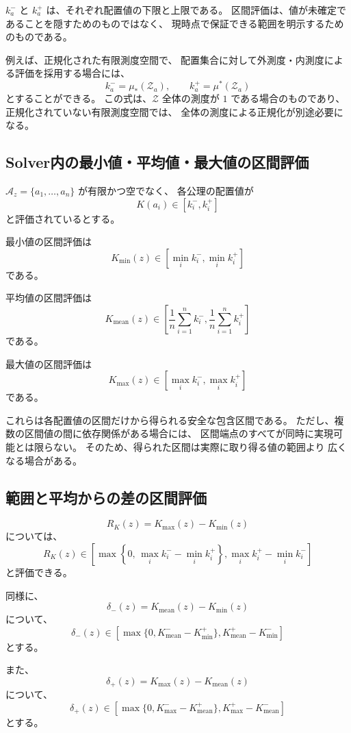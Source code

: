 \documentclass[a4paper,12pt]{article}
\begin{document}
$k_a^-$ と $k_a^+$ は、それぞれ配置値の下限と上限である。
区間評価は、値が未確定であることを隠すためのものではなく、
現時点で保証できる範囲を明示するためのものである。

例えば、正規化された有限測度空間で、
配置集合に対して外測度・内測度による評価を採用する場合には、
\[
    k_a^-=\mu_*(\mathcal{Z}_a),
    \qquad
    k_a^+=\mu^*(\mathcal{Z}_a)
\]
とすることができる。
この式は、$\mathcal{Z}$ 全体の測度が $1$ である場合のものであり、
正規化されていない有限測度空間では、
全体の測度による正規化が別途必要になる。

\subsection{Solver内の最小値・平均値・最大値の区間評価}

$\mathcal{A}_z=\{a_1,\ldots,a_n\}$ が有限かつ空でなく、
各公理の配置値が
\[
    K(a_i)\in[k_i^-,k_i^+]
\]
と評価されているとする。

最小値の区間評価は
\[
    K_{\min}(z)
    \in
    \left[
        \min_i k_i^-,
        \min_i k_i^+
    \right]
\]
である。

平均値の区間評価は
\[
    K_{\mathrm{mean}}(z)
    \in
    \left[
        \frac{1}{n}\sum_{i=1}^n k_i^-,
        \frac{1}{n}\sum_{i=1}^n k_i^+
    \right]
\]
である。

最大値の区間評価は
\[
    K_{\max}(z)
    \in
    \left[
        \max_i k_i^-,
        \max_i k_i^+
    \right]
\]
である。

これらは各配置値の区間だけから得られる安全な包含区間である。
ただし、複数の区間値の間に依存関係がある場合には、
区間端点のすべてが同時に実現可能とは限らない。
そのため、得られた区間は実際に取り得る値の範囲より
広くなる場合がある。

\subsection{範囲と平均からの差の区間評価}

\[
    R_K(z)=K_{\max}(z)-K_{\min}(z)
\]
については、
\[
    R_K(z)\in
    \left[
        \max\left\{0,\,
        \max_i k_i^--\min_i k_i^+\right\},
        \max_i k_i^+-\min_i k_i^-
    \right]
\]
と評価できる。

同様に、
\[
    \delta_-(z)=K_{\mathrm{mean}}(z)-K_{\min}(z)
\]
について、
\[
    \delta_-(z)\in
    \left[
        \max\{0,K_{\mathrm{mean}}^--K_{\min}^+\},
        K_{\mathrm{mean}}^+-K_{\min}^-
    \right]
\]
とする。

また、
\[
    \delta_+(z)=K_{\max}(z)-K_{\mathrm{mean}}(z)
\]
について、
\[
    \delta_+(z)\in
    \left[
        \max\{0,K_{\max}^--K_{\mathrm{mean}}^+\},
        K_{\max}^+-K_{\mathrm{mean}}^-
    \right]
\]
とする。
\end{document}
